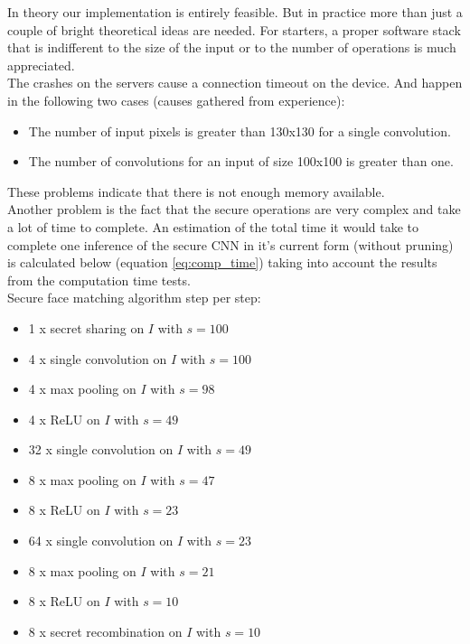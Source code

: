 In theory our implementation is entirely feasible. But in practice more than just a couple of bright theoretical ideas are needed. For starters, a proper software stack that is indifferent to the size of the input or to the number of operations is much appreciated.\\

The crashes on the servers cause a connection timeout on the device. And happen in the following two cases (causes gathered from experience):

\begin{itemize}
  \item The number of input pixels is greater than 130x130 for a single convolution.
  \item The number of convolutions for an input of size 100x100 is greater than one.
\end{itemize}

These problems indicate that there is not enough memory available.\\

Another problem is the fact that the secure operations are very complex and take a lot of time to complete. An estimation of the total time it would take to complete one inference of the secure CNN in it's current form (without pruning) is calculated below (equation \ref{eq:comp_time}) taking into account the results from the computation time tests.\\

Secure face matching algorithm step per step:
\begin{itemize}
  \item 1 x secret sharing on $I$ with $s=100$
  \item 4 x single convolution on $I$ with $s=100$
  \item 4 x max pooling on $I$ with $s=98$
  \item 4 x ReLU on $I$ with $s=49$
  \item 32 x single convolution on $I$ with $s=49$
  \item 8 x max pooling on $I$ with $s=47$
  \item 8 x ReLU on $I$ with $s=23$
  \item 64 x single convolution on $I$ with $s=23$
  \item 8 x max pooling on $I$ with $s=21$
  \item 8 x ReLU on $I$ with $s=10$
  \item 8 x secret recombination on $I$ with $s=10$
\end{itemize}

